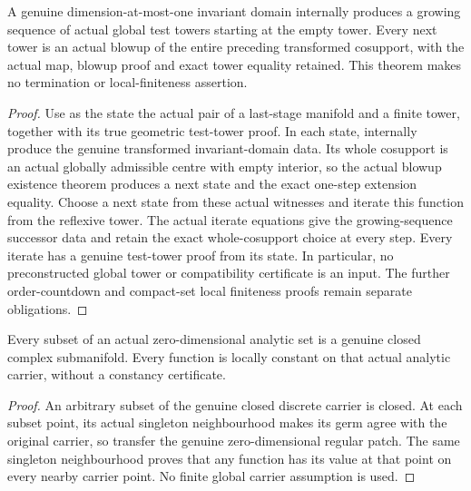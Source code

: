\begin{theorem}
\label{hir:one-dimensional-global-cosupport-growing-sequence}
\leanok
A genuine dimension-at-most-one invariant domain internally produces a
growing sequence of actual global test towers starting at the empty tower.
Every next tower is an actual blowup of the entire preceding transformed
cosupport, with the actual map, blowup proof and exact tower equality retained.
This theorem makes no termination or local-finiteness assertion.
\end{theorem}
\begin{proof}
Use as the state the actual pair of a last-stage manifold and a finite tower,
together with its true geometric test-tower proof. In each state, internally
produce the genuine transformed invariant-domain data. Its whole cosupport
is an actual globally admissible centre with empty interior, so the actual
blowup existence theorem produces a next state and the exact one-step
extension equality. Choose a next state from these actual witnesses and
iterate this function from the reflexive tower. The actual iterate equations
give the growing-sequence successor data and retain the exact whole-cosupport
choice at every step. Every iterate has a genuine test-tower proof from its
state. In particular, no preconstructed global tower or compatibility
certificate is an input. The further order-countdown and compact-set local
finiteness proofs remain separate obligations.
\end{proof}

\begin{theorem}
\label{hir:analytic-dimzero-subsets-and-constancy}
\leanok
Every subset of an actual zero-dimensional analytic set is a genuine
closed complex submanifold. Every function is locally constant on that
actual analytic carrier, without a constancy certificate.
\end{theorem}
\begin{proof}
An arbitrary subset of the genuine closed discrete carrier is closed.
At each subset point, its actual singleton neighbourhood makes its
germ agree with the original carrier, so transfer the genuine
zero-dimensional regular patch. The same singleton neighbourhood
proves that any function has its value at that point on every nearby
carrier point. No finite global carrier assumption is used.
\end{proof}

